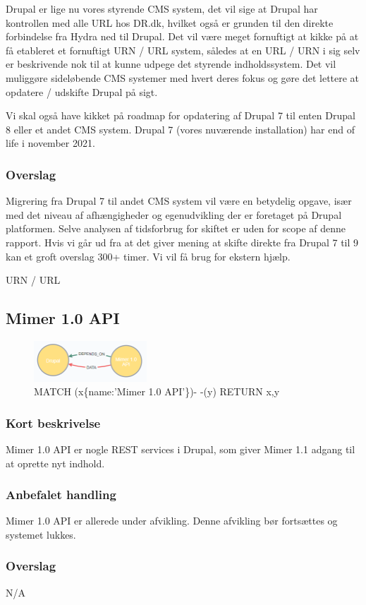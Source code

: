 \documentclass{article}
\begin{document}
Drupal er lige nu vores styrende CMS system, det vil sige at Drupal har kontrollen med alle URL hos DR.dk, hvilket også er grunden til den direkte forbindelse fra Hydra ned til Drupal. Det vil være meget fornuftigt at kikke på at få etableret et fornuftigt URN / URL system, således at en URL / URN i sig selv er beskrivende nok til at kunne udpege det styrende indholdssystem. Det vil muliggøre sideløbende CMS systemer med hvert deres fokus og gøre det lettere at opdatere / udskifte Drupal på sigt.
 
Vi skal også have kikket på roadmap for opdatering af Drupal 7 til enten Drupal 8 eller et andet CMS system. Drupal 7 (vores nuværende installation) har end of life i november 2021.
\subsubsection{Overslag}
Migrering fra Drupal 7 til andet CMS system vil være en betydelig opgave, især med det niveau af afhængigheder og egenudvikling der er foretaget på Drupal platformen. 
Selve analysen af tidsforbrug for skiftet er uden for scope af denne rapport. Hvis vi går ud fra at det giver mening at skifte direkte fra Drupal 7 til 9 kan et groft overslag 300+ timer. Vi vil få brug for ekstern hjælp.

URN / URL 


\subsection{Mimer 1.0 API}
\begin{figure}[h]
\includegraphics[width=120pt]{MimerAPI.PNG}
\caption{MATCH (x\{name:'Mimer 1.0 API'\})- -(y) RETURN x,y}
\end{figure}
\subsubsection{Kort beskrivelse}
Mimer 1.0 API er nogle REST services i Drupal, som giver Mimer 1.1 adgang til at oprette nyt indhold.
\subsubsection{Anbefalet handling}
Mimer 1.0 API er allerede under afvikling. Denne afvikling bør fortsættes og systemet lukkes.
\subsubsection{Overslag}
N/A
\end{document}
